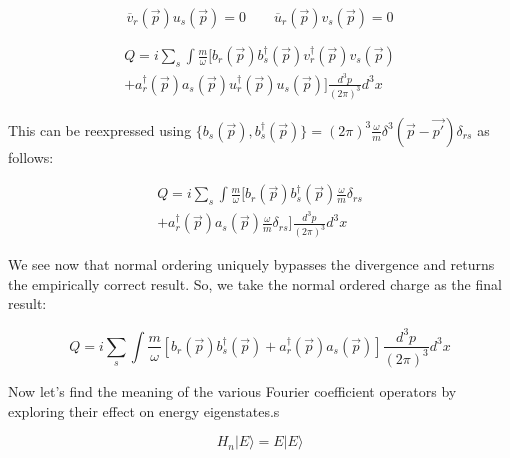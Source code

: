 \documentclass[a4]{article}
\begin{document}
    \begin{equation}
        \overline{v}_r (\vec{p}) u_s (\vec{p}) = 0 \qquad \overline{u}_r (\vec{p}) v_s (\vec{p}) = 0
    \end{equation}

    \begin{equation}
        \begin{aligned}
            Q = i \sum_{s} \int \frac{m}{\omega} [b_r (\vec{p}) b_s^{\dagger} (\vec{p}) v_r^{\dagger} (\vec{p}) v_s (\vec{p}) \\
        + a_r^{\dagger} (\vec{p}) a_s (\vec{p}) u_r^{\dagger} (\vec{p}) u_s (\vec{p})] \frac{d^{3} p}{(2 \pi)^3} d^3 x
        \end{aligned}
    \end{equation}

    This can be reexpressed using $\{ b_s (\vec{p}), b_s^{\dagger} (\vec{p}) \} = (2 \pi)^3 \frac{\omega}{m} \delta^3 (\vec{p} - \vec{p'}) \delta_{rs}$ as follows:

    \begin{equation}
        \begin{aligned}
            Q = i \sum_{s} \int \frac{m}{\omega} [b_r (\vec{p}) b_s^{\dagger} (\vec{p}) \frac{\omega}{m} \delta_{rs} \\
        + a_r^{\dagger} (\vec{p}) a_s (\vec{p}) \frac{\omega}{m} \delta_{rs}] \frac{d^{3} p}{(2 \pi)^3} d^3 x
        \end{aligned}
    \end{equation}

    We see now that normal ordering uniquely bypasses the divergence and returns the empirically correct result. So, we take the normal ordered charge as the final
    result:

    \begin{framed}
        \begin{equation}
            Q = i \sum_{s} \int \frac{m}{\omega} [b_r (\vec{p}) b_s^{\dagger} (\vec{p})
            + a_r^{\dagger} (\vec{p}) a_s (\vec{p})] \frac{d^{3} p}{(2 \pi)^3} d^3 x
        \end{equation}
    \end{framed}

    Now let's find the meaning of the various Fourier coefficient operators by exploring their effect on energy eigenstates.s

    \begin{equation}
        H_n | E \rangle = E | E \rangle
    \end{equation}
\end{document}
